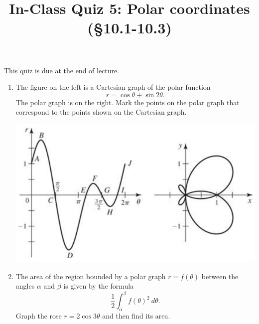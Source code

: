 \documentclass[]{article}
\title{\vspace{-3.5pc} 
	\flushleft \bf \Large In-Class Quiz 5: Polar coordinates \\ (\S 10.1-10.3)}
\date{}
\begin{document}
\maketitle

\vspace{-3pc}
 This quiz is due at the end of lecture.  

\noindent\hrulefill

\begin{enumerate}

\item %
The figure on the left is a Cartesian graph of the polar function 
\[
r=\cos{\theta}+\sin{2\theta}.
\]
The polar graph is on the right.  Mark the points on the polar graph that correspond to the points shown on the Cartesian graph.

\begin{center}
\includegraphics[scale=1.1]{Q5pic}
\end{center}

\newpage
\item %
The area of the region bounded by a polar graph $r=f(\theta)$ between the angles $\alpha$ and $\beta$ is given by the formula
\[
\frac{1}{2}\int_{\alpha}^{\beta}f(\theta)^2\ d\theta.
\]
Graph the rose $r=2\cos{3\theta}$ and then find its area. 

\end{enumerate}
\end{document}
